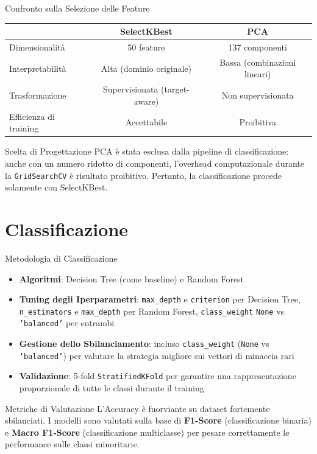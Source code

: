 \documentclass{beamer}
\begin{document}
\begin{frame}{Confronto sulla Selezione delle Feature}
    \small
    \begin{tabular}{lcc}
      \toprule
       & \textbf{SelectKBest} & \textbf{PCA} \\
      \midrule
      Dimensionalità & 50 feature & 137 componenti \\
      Interpretabilità & Alta (dominio originale) & Bassa (combinazioni lineari) \\
      Trasformazione & Supervisionata (target-aware) & Non supervisionata \\
      Efficienza di training & Accettabile & Proibitiva \\
      \bottomrule
    \end{tabular}
  \vspace{0.5cm}
  \begin{alertblock}{Scelta di Progettazione}
    PCA è stata esclusa dalla pipeline di classificazione: anche con un numero ridotto di componenti, l'overhead computazionale durante la \texttt{GridSearchCV} è risultato proibitivo. Pertanto, la classificazione procede solamente con SelectKBest.
  \end{alertblock}
\end{frame}

\section{Classificazione}

\begin{frame}{Metodologia di Classificazione}
  \begin{itemize}
    \item \textbf{Algoritmi}: Decision Tree (come baseline) e Random Forest
    \item \textbf{Tuning degli Iperparametri}: \texttt{max\_depth} e \texttt{criterion} per Decision Tree, \texttt{n\_estimators} e \texttt{max\_depth} per Random Forest, \texttt{class\_weight} \texttt{None} vs \texttt{'balanced'} per entrambi
    \item \textbf{Gestione dello Sbilanciamento}: incluso \texttt{class\_weight} (\texttt{None} vs \texttt{'balanced'}) per valutare la strategia migliore sui vettori di minaccia rari
    \item \textbf{Validazione}: 5-fold \texttt{StratifiedKFold} per garantire una rappresentazione proporzionale di tutte le classi durante il training
  \end{itemize}
  \vspace{0.2cm}
  \begin{block}{Metriche di Valutazione}
    L'Accuracy è fuorviante su dataset fortemente sbilanciati. I modelli sono valutati sulla base di \textbf{F1-Score} (classificazione binaria) e \textbf{Macro F1-Score} 
    (classificazione multiclasse) per pesare correttamente le performance sulle classi minoritarie.
  \end{block}
\end{frame}
\end{document}
